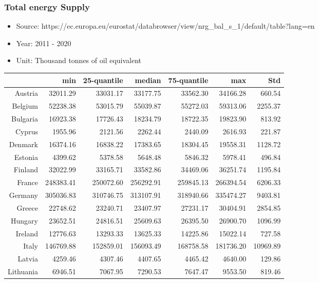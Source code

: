 \documentclass[a4paper,twoside,10pt]{article}
\begin{document}
\subsubsection{Total energy Supply}
	\begin{itemize}
	\item Source: https://ec.europa.eu/eurostat/databrowser/view/nrg\_bal\_s\_1/default/table?lang=en
	\item Year: 2011 - 2020
	\item Unit: Thousand tonnes of oil equivalent
\end{itemize}
\begin{table}[H]
	\centering
	\begin{tabular}{|r|rrrrr|r|}
  \hline
& min & 25-quantile & median & 75-quantile & max & Std \\ 
\hline
Austria & 32011.29 & 33031.17 & 33177.75 & 33562.30 & 34166.28 & 660.54 \\ 
Belgium & 52238.38 & 53015.79 & 55039.87 & 55272.03 & 59313.06 & 2255.37 \\ 
Bulgaria & 16923.38 & 17726.43 & 18234.79 & 18722.35 & 19823.90 & 813.92 \\ 
Cyprus & 1955.96 & 2121.56 & 2262.44 & 2440.09 & 2616.93 & 221.87 \\ 
Denmark & 16374.16 & 16838.22 & 17383.65 & 18304.45 & 19558.31 & 1128.72 \\
  \hline 
Estonia & 4399.62 & 5378.58 & 5648.48 & 5846.32 & 5978.41 & 496.84 \\ 
Finland & 32022.99 & 33165.71 & 33582.86 & 34469.06 & 36251.74 & 1195.84 \\ 
France & 248383.41 & 250072.60 & 256292.91 & 259845.13 & 266394.54 & 6206.33 \\ 
Germany & 305036.83 & 310746.75 & 313107.91 & 318940.66 & 335474.27 & 9403.81 \\ 
Greece & 22748.62 & 23240.71 & 23407.97 & 27231.17 & 30404.91 & 2854.85 \\ 
  \hline
Hungary & 23652.51 & 24816.51 & 25609.63 & 26395.50 & 26900.70 & 1096.99 \\ 
Ireland & 12776.63 & 13293.33 & 13625.33 & 14225.86 & 15022.14 & 727.58 \\ 
Italy & 146769.88 & 152859.01 & 156093.49 & 168758.58 & 181736.20 & 10969.89 \\ 
Latvia & 4259.46 & 4307.46 & 4407.65 & 4465.42 & 4640.00 & 129.86 \\ 
Lithuania & 6946.51 & 7067.95 & 7290.53 & 7647.47 & 9553.50 & 819.46 \\ 

\end{tabular}
\end{table}
\end{document}
